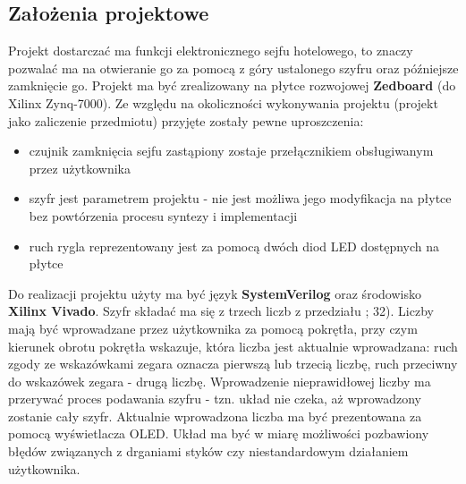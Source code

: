 \documentclass[12pt] {article}
\begin{document}
\subsection{Założenia projektowe}
Projekt dostarczać ma funkcji elektronicznego sejfu hotelowego, to znaczy pozwalać ma na otwieranie go za pomocą z góry ustalonego szyfru oraz późniejsze zamknięcie go. Projekt ma być zrealizowany na płytce rozwojowej \textbf{Zedboard} (do Xilinx Zynq-7000). Ze względu na okoliczności wykonywania projektu (projekt jako zaliczenie przedmiotu) przyjęte zostały pewne uproszczenia:
\begin{itemize}
\item czujnik zamknięcia sejfu zastąpiony zostaje przełącznikiem obsługiwanym przez użytkownika
\item szyfr jest parametrem projektu - nie jest możliwa jego modyfikacja na płytce bez powtórzenia procesu syntezy i implementacji
\item ruch rygla reprezentowany jest za pomocą dwóch diod LED dostępnych na płytce
\end{itemize}
Do realizacji projektu użyty ma być język \textbf{SystemVerilog} oraz środowisko \textbf{Xilinx Vivado}. 
Szyfr składać ma się z trzech liczb z przedziału ; 32). Liczby mają być wprowadzane przez użytkownika za pomocą pokrętła, przy czym kierunek obrotu pokrętła wskazuje, która liczba jest aktualnie wprowadzana: ruch zgody ze wskazówkami zegara oznacza pierwszą lub trzecią liczbę, ruch przeciwny do wskazówek zegara - drugą liczbę. Wprowadzenie nieprawidłowej liczby ma przerywać proces podawania szyfru - tzn. układ nie czeka, aż wprowadzony zostanie cały szyfr. Aktualnie wprowadzona liczba ma być prezentowana za pomocą wyświetlacza OLED.
Układ ma być w miarę możliwości pozbawiony błędów związanych z drganiami styków czy niestandardowym działaniem użytkownika.
\end{document}
